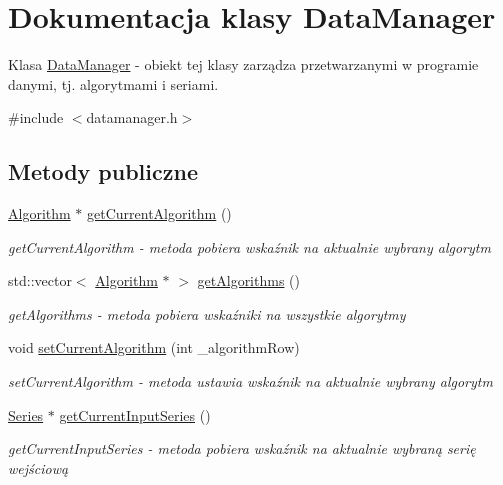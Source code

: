 \hypertarget{class_data_manager}{\section{Dokumentacja klasy Data\+Manager}
\label{class_data_manager}
}


Klasa \hyperlink{class_data_manager}{Data\+Manager} -\/ obiekt tej klasy zarządza przetwarzanymi w programie danymi, tj. algorytmami i seriami.  




{\ttfamily \#include $<$datamanager.\+h$>$}

\subsection*{Metody publiczne}
\begin{DoxyCompactItemize}
\item 
\hyperlink{class_algorithm}{Algorithm} $\ast$ \hyperlink{class_data_manager_a8d0afcc6bd82efea1a087a77ba046df0}{get\+Current\+Algorithm} ()
\begin{DoxyCompactList}\small\item\em get\+Current\+Algorithm -\/ metoda pobiera wskaźnik na aktualnie wybrany algorytm \end{DoxyCompactList}\item 
std\+::vector$<$ \hyperlink{class_algorithm}{Algorithm} $\ast$ $>$ \hyperlink{class_data_manager_afb85e233fe55a742241597aeb988c6ae}{get\+Algorithms} ()
\begin{DoxyCompactList}\small\item\em get\+Algorithms -\/ metoda pobiera wskaźniki na wszystkie algorytmy \end{DoxyCompactList}\item 
void \hyperlink{class_data_manager_ac840fe3df9dcb8c7fed38c40d817fbc4}{set\+Current\+Algorithm} (int \+\_\+algorithm\+Row)
\begin{DoxyCompactList}\small\item\em set\+Current\+Algorithm -\/ metoda ustawia wskaźnik na aktualnie wybrany algorytm \end{DoxyCompactList}\item 
\hyperlink{class_series}{Series} $\ast$ \hyperlink{class_data_manager_a7071330f82722bfa47994c90325c76ec}{get\+Current\+Input\+Series} ()
\begin{DoxyCompactList}\small\item\em get\+Current\+Input\+Series -\/ metoda pobiera wskaźnik na aktualnie wybraną serię wejściową \end{DoxyCompactList}\item 

\end{DoxyCompactItemize}
